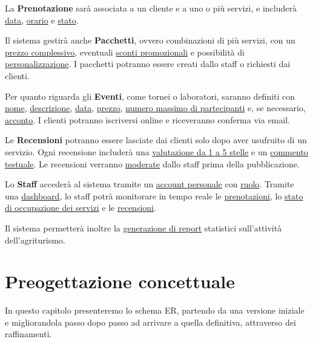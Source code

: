 \documentclass[a4paper,12pt]{report}
\begin{document}
La \textbf{Prenotazione} sarà associata a un cliente e a uno o più servizi, e includerà
\underline{data}, \underline{orario} e \underline{stato}.

Il sistema gestirà anche \textbf{Pacchetti}, ovvero combinazioni di più servizi, con un \newline
\underline{prezzo complessivo}, eventuali \underline{sconti promozionali} e possibilità di
\underline{personalizzazione}. I pacchetti potranno essere creati dallo staff o richiesti dai
clienti.

Per quanto riguarda gli \textbf{Eventi}, come tornei o laboratori, saranno definiti con
\underline{nome}, \underline{descrizione}, \underline{data}, \underline{prezzo}, \underline{numero
	massimo di partecipanti} e, se necessario, \underline{acconto}. I clienti potranno iscriversi
online e riceveranno conferma via email.

Le \textbf{Recensioni} potranno essere lasciate dai clienti solo dopo aver usufruito di un servizio.
Ogni recensione includerà una \underline{valutazione da 1 a 5 stelle} e un \underline{commento
	testuale}. Le recensioni verranno \underline{moderate} dallo staff prima della pubblicazione.

Lo \textbf{Staff} accederà al sistema tramite un \underline{account personale} con \underline{ruolo}.
Tramite una \underline{dashboard}, lo staff potrà monitorare in tempo reale le \underline{prenotazioni},
lo \newline \underline{stato di occupazione dei servizi} e le \underline{recensioni}.

Il sistema permetterà inoltre la \underline{generazione di report} statistici sull'attività
dell'agriturismo.



\chapter{Preogettazione concettuale}
In questo capitolo presenteremo lo schema ER, partendo da una versione iniziale e migliorandola passo dopo passo ad arrivare a quella
definitiva, attraverso dei raffinamenti.
\end{document}
